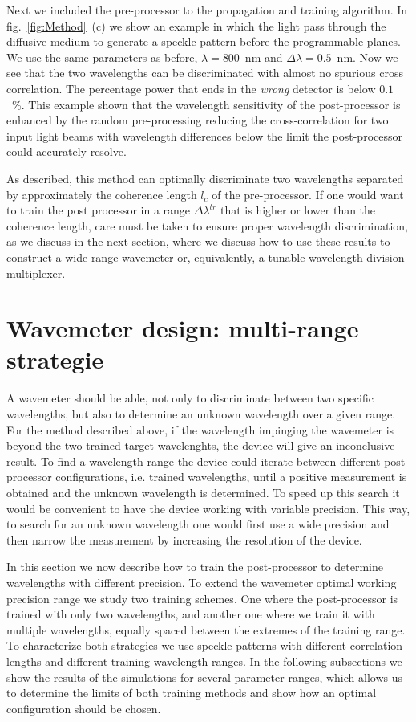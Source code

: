 \documentclass{optica-article}
\begin{document}
Next we included the pre-processor to the propagation and training algorithm. In fig.~\ref{fig:Method}~(c) we show an example in which the light pass through the diffusive medium to generate a speckle pattern before the programmable planes. We use the same parameters as before, $\lambda=800$~nm and $\Delta\lambda=0.5$~nm.
Now we see that the two wavelengths can be discriminated with almost no spurious cross correlation. The percentage power that ends in the \textit{wrong} detector is below $0.1$~\%.  This example shown that the wavelength sensitivity of the post-processor is enhanced by the random pre-processing reducing the cross-correlation for two input light beams with wavelength differences below the limit the post-processor could accurately resolve.

As described, this method can optimally discriminate two wavelengths separated by approximately the coherence length $l_c$ of the pre-processor. If one would want to train the post processor in a range $\Delta \lambda^\mathit{tr}$ that is higher or lower than the coherence length, care must be taken to ensure proper wavelength discrimination, as we discuss in the next section, where we discuss how to use these results to construct a wide range wavemeter or, equivalently, a tunable wavelength division multiplexer.


\section{Wavemeter design: multi-range strategie}\label{sec: algorithms}

A wavemeter should be able, not only to discriminate between two specific wavelengths, but also to determine an unknown  wavelength over a given range. For the method described above, if the wavelength impinging the wavemeter is beyond the two trained target wavelenghts, the device will give an inconclusive result. To find a wavelength range the device could iterate between different post-processor configurations, i.e. trained wavelengths, until a positive measurement is obtained and the unknown wavelength is determined. To speed up this search it would be convenient to have the device working with variable precision. This way, to search for an unknown wavelength one would first use a wide precision and then narrow the measurement by increasing the resolution of the device.

In this section we now describe how to train the post-processor to determine wavelengths with different precision.
To extend the wavemeter optimal working precision range we study two training schemes. One where the post-processor is trained with only two wavelengths, and another one where we train it with multiple wavelengths, equally spaced between the extremes of the training range. To characterize both strategies we use speckle patterns with different correlation lengths and different training wavelength ranges. In the following subsections we show the results of the simulations for several parameter ranges, which allows us to determine the limits of both training methods and show how an optimal configuration should be chosen.
\end{document}
